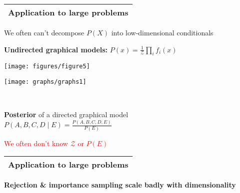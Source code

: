 \documentclass[25pt,landscape]{foils}
\newcommand{\Red}{\textcolor{red}}
\newcommand{\Gray}{\textcolor{mygray}}
\newcommand{\Green}{\textcolor{mypine}}
\newcommand{\myfoilhead}[1]{
\newpage
\vspace*{-1cm}
\Gray{
\begin{tabular*}{\textwidth}{l}
{\bf \Huge #1} \\
\bottomrule
\end{tabular*}}}
\newcommand{\Z}{\mathcal{Z}}
\newcommand{\g}{\!\mid\!} %
\begin{document}
\vfill
\vfill


\myfoilhead{Application to large problems}

\vfill

We often can't decompose $P(X)$ into low-dimensional conditionals

\vfill

\begin{minipage}{0.75\linewidth}
\Green{\bf Undirected graphical models:} $P(x) = \frac{1}{\Z} \prod_i f_i(x)$
\end{minipage}
\begin{minipage}{0.3\linewidth}
\texttt{[image: figures/figure5]}
\end{minipage}

\vfill

\begin{minipage}{0.35\linewidth}
\texttt{[image: graphs/graphs1]}
\end{minipage}~~~
\begin{minipage}{0.65\linewidth}
\Green{\bf Posterior} of a directed graphical model\\

$\displaystyle P(A,B,C,D\g E) = \frac{P(A,B,C,D,E)}{P(E)}$
\end{minipage}

\begin{flushright}
\Red{We often don't know $\Z$ or $P(E)$}
\end{flushright}

\vspace*{-0.5cm}

\myfoilhead{Application to large problems}

\vfill

\Green{\bf Rejection \& importance sampling scale badly with dimensionality}\\
\end{document}
